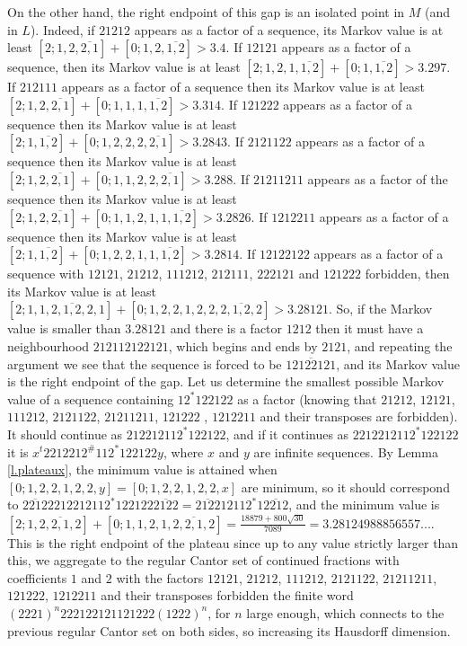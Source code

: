 \documentclass[10pt]{amsart}
\numberwithin{equation}{section}
\theoremstyle{definition}
\begin{document}
On the other hand, the right endpoint of this gap is an isolated point in $M$
(and in $L$). Indeed, if $21212$ appears as a factor of a sequence, its Markov
value is at least $[2;1,2,\overline{2,1}]+[0;1,2,\overline{1,2}]>3.4$. If
$12121$ appears as a factor of a sequence, then its Markov value is at least
$[2;1,2,1,\overline{1,2}]+[0;1,\overline{1,2}]>3.297$. If $212111$ appears as a
factor of a sequence then its Markov value is at least
$[2;1,2,\overline{2,1}]+[0;1,1,1,\overline{1,2}]>3.314$. If $121222$ appears as
a factor of a sequence then its Markov value is at least
$[2;1,\overline{1,2}]+[0;1,2,2,2,\overline{2,1}]>3.2843$. If $2121122$ appears
as a factor of a sequence then its Markov value is at least
$[2;1,2,\overline{2,1}]+[0;1,1,2,2,\overline{2,1}]>3.288$. If $21211211$ appears
as a factor of the sequence then its Markov value is at least
$[2;1,2,\overline{2,1}]+[0;1,1,2,1,1,\overline{1,2}]>3.2826$. If $1212211$
appears as a factor of a sequence then its Markov value is at least
$[2;1,\overline{1,2}]+[0;1,2,2,1,1,\overline{1,2}]>3.2814$. If $12122122$
appears as a factor of a sequence with $12121$, $21212$, $111212$, $212111$,
$222121$ and $121222$ forbidden, then its Markov value is at least
$[2;1,\overline{1,2,1,2,2,1}]+[0;1,2,2,1,2,2,\overline{2,1,2,2}]>3.28121$. So,
if the Markov value is smaller than $3.28121$ and there is a factor $1212$ then
it must have a neighbourhood $212112122121$, which begins and ends by $2121$,
and repeating the argument we see that the sequence is forced to be
$\overline{12122121}$, and its Markov value is the right endpoint of the gap.
Let us determine the smallest possible Markov value of a sequence containing
$12^*122122$ as a factor (knowing that $21212$, $12121$, $111212$, $2121122$,
$21211211$, $121222$ , $1212211$ and their transposes are forbidden). It should
continue as $212212112^*122122$, and if it continues as $2212212112^*122122$ it
is $x^{t}2212212^{\#}112^*122122y$, where $x$ and $y$ are infinite sequences. By
Lemma \ref{l.plateaux}, the minimum value is attained when
$[0;1,2,2,1,2,2,y]=[0;1,2,2,1,2,2,x]$ are minimum, so it should correspond to
$\overline{2212}2212212112^*122122\overline{2122}=\overline{2122}12112^*1\overline{2212}$,
and the minimum value is
$[2;1,\overline{2,2,1,2}]+[0;1,1,2,1,\overline{2,2,1,2}]=\frac{18879+800\sqrt{30}}{7089}=3.28124988856557...$.
This is the right endpoint of the plateau since up to any value strictly larger
than this, we aggregate to the regular Cantor set of continued fractions with
coefficients $1$ and $2$ with the factors $12121$, $21212$, $111212$, $2121122$,
$21211211$, $121222$, $1212211$ and their transposes forbidden the finite word
$(2221)^n 222122121121222 (1222)^n$, for $n$ large enough, which connects to the
previous regular Cantor set on both sides, so increasing its Hausdorff
dimension. 
\end{document}
